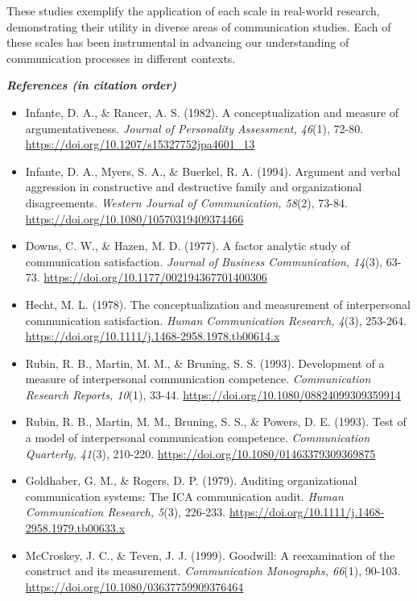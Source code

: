 \documentclass[
]{book}
\providecommand{\tightlist}{%
  \setlength{\itemsep}{0pt}\setlength{\parskip}{0pt}}
\begin{document}
These studies exemplify the application of each scale in real-world research, demonstrating their utility in diverse areas of communication studies. Each of these scales has been instrumental in advancing our understanding of communication processes in different contexts.

\textbf{\emph{References (in citation order)}}

\begin{itemize}
\tightlist
\item
  Infante, D. A., \& Rancer, A. S. (1982). A conceptualization and measure of argumentativeness. \emph{Journal of Personality Assessment, 46}(1), 72-80. \url{https://doi.org/10.1207/s15327752jpa4601_13}
\item
  Infante, D. A., Myers, S. A., \& Buerkel, R. A. (1994). Argument and verbal aggression in constructive and destructive family and organizational disagreements. \emph{Western Journal of Communication, 58}(2), 73-84. \url{https://doi.org/10.1080/10570319409374466}
\item
  Downs, C. W., \& Hazen, M. D. (1977). A factor analytic study of communication satisfaction. \emph{Journal of Business Communication, 14}(3), 63-73. \url{https://doi.org/10.1177/002194367701400306}
\item
  Hecht, M. L. (1978). The conceptualization and measurement of interpersonal communication satisfaction. \emph{Human Communication Research, 4}(3), 253-264. \url{https://doi.org/10.1111/j.1468-2958.1978.tb00614.x}
\item
  Rubin, R. B., Martin, M. M., \& Bruning, S. S. (1993). Development of a measure of interpersonal communication competence. \emph{Communication Research Reports, 10}(1), 33-44. \url{https://doi.org/10.1080/08824099309359914}
\item
  Rubin, R. B., Martin, M. M., Bruning, S. S., \& Powers, D. E. (1993). Test of a model of interpersonal communication competence. \emph{Communication Quarterly, 41}(3), 210-220. \url{https://doi.org/10.1080/01463379309369875}
\item
  Goldhaber, G. M., \& Rogers, D. P. (1979). Auditing organizational communication systems: The ICA communication audit. \emph{Human Communication Research, 5}(3), 226-233. \url{https://doi.org/10.1111/j.1468-2958.1979.tb00633.x}
\item
  McCroskey, J. C., \& Teven, J. J. (1999). Goodwill: A reexamination of the construct and its measurement. \emph{Communication Monographs, 66}(1), 90-103. \url{https://doi.org/10.1080/03637759909376464}

\end{itemize}
\end{document}
